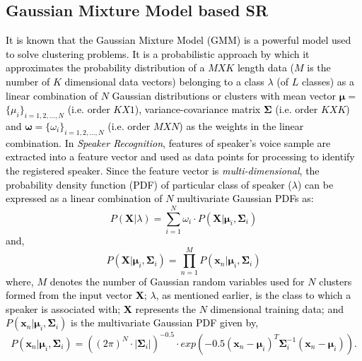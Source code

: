 \documentclass{article}
\begin{document}
\subsection{Gaussian Mixture Model based SR} 
\textcolor{black}{It is known that the Gaussian Mixture Model (GMM) is a 
powerful model used to solve clustering problems.  
It is a probabilistic approach by which it approximates the probability distribution of a $M X K$ length data ($ M$ is the number of $ K$ dimensional data vectors) belonging to a class $\lambda$ (of $L$ classes) as a linear combination of $ N$ Gaussian distributions or clusters %
with mean vector $\bm \mu$$=$$\{\mu_i\}_{i=1,2,\ldots,N}$ (i.e. order $K$$X$$1$), variance-covariance \textcolor{black}{matrix} %
${\bm\Sigma}$ (i.e. order $K$$X$$K$) and $\bm \omega$$=$$\{\omega_i\}_{i=1,2,\ldots,N}$ (i.e. order $M$$X$$N$) as the weights in the linear combination.} \textcolor{black}{In 
\textit{Speaker Recognition}, features of speaker's voice sample 
are extracted into a feature vector and used as data points for processing to identify the registered speaker. %
Since the feature vector is \textit{multi-dimensional}, %
the probability density function (PDF) 
of particular class of speaker ($\lambda$) can be expressed as a linear combination of $N$ multivariate Gaussian PDFs as:
\begin{equation}
P(\bm X\vert\lambda) = \sum\limits_{i=1}^N \omega_i \cdot P(\bm X|\bm \mu_i,\bm \Sigma_i)
\label{eq1}
\end{equation}
and,
\begin{equation}
P(\bm X|\bm \mu_i,\bm \Sigma_i) = \prod\limits_{n=1}^M P(\bm x_n|\bm \mu_i,\bm \Sigma_i)
\end{equation}
where, $M$ denotes the number of Gaussian random variables used for $N$ clusters formed from the input vector $\bm X$; \textbf{$\lambda$}, as mentioned earlier, is the class to which a speaker is associated with; $\bm X$ represents the $N$ dimensional training data; and $P(\bm x_n|\bm\mu_i,\bm\Sigma_i)$ is the multivariate Gaussian PDF given by,%
\begin{equation}
P(\bm x_n|\bm\mu_i,\bm\Sigma_i) = \left({{(2\pi)^N\cdot |\bm\Sigma_i|}}\right)^{-0.5}\cdot exp\left({-0.5 (\bm x_n-\bm\mu_i)^T\bm\Sigma_i^{-1}(\bm x_n- \bm \mu_i)}\right).
\end{equation}
}
\end{document}
